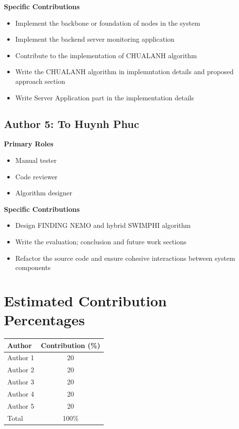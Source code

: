 \documentclass[11pt,a4paper]{article}
\begin{document}
\textbf{Specific Contributions}
\begin{itemize}
    \item Implement the backbone or foundation of nodes in the system
    \item Implement the backend server monitoring application
    \item Contribute to the implementation of CHUALANH algorithm
    \item Write the CHUALANH algorithm in implemntation details and proposed approach section
    \item Write Server Application part in the implementation details 
\end{itemize}

\subsection*{Author 5: To Huynh Phuc}

\textbf{Primary Roles}
\begin{itemize}
    \item Manual tester
    \item Code reviewer
    \item Algorithm designer
\end{itemize}

\textbf{Specific Contributions}
\begin{itemize}
    \item Design FINDING NEMO and hybrid SWIMPHI algorithm
    \item Write the evaluation; conclusion and future work sections
    \item Refactor the source code and ensure cohesive interactions between system components
\end{itemize}


\section{Estimated Contribution Percentages}

\begin{center}
\begin{tabular}{lc}
\toprule
\textbf{Author} & \textbf{Contribution (\%)} \\
\midrule
Author 1 & 20 \\
Author 2 & 20 \\
Author 3 & 20 \\
Author 4 & 20 \\
Author 5 & 20 \\
\midrule
Total & 100\% \\
\bottomrule
\end{tabular}
\end{center}
\end{document}
